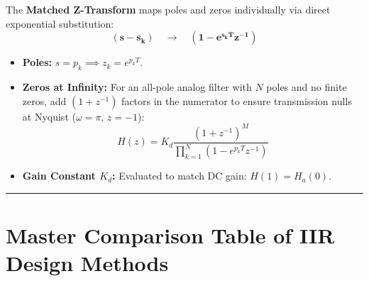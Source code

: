 \documentclass[11pt,a4paper]{article}
\begin{document}
The \textbf{Matched Z-Transform} maps poles and zeros individually via direct exponential substitution:
\begin{equation}
\mathbf{(s - s_k) \quad \longrightarrow \quad (1 - e^{s_k T} z^{-1})}
\end{equation}
\begin{itemize}
    \item \textbf{Poles:} $s = p_k \implies z_k = e^{p_k T}$.
    \item \textbf{Zeros at Infinity:} For an all-pole analog filter with $N$ poles and no finite zeros, add $(1 + z^{-1})$ factors in the numerator to ensure transmission nulls at Nyquist ($\omega = \pi$, $z = -1$):
    \begin{equation}
    H(z) = K_d \frac{(1 + z^{-1})^M}{\prod_{k=1}^N (1 - e^{p_k T} z^{-1})}
    \end{equation}
    \item \textbf{Gain Constant $K_d$:} Evaluated to match DC gain: $H(1) = H_a(0)$.
\end{itemize}

\noindent\rule{\textwidth}{0.5pt}

\section{Master Comparison Table of IIR Design Methods}

\begin{table}[H]
\centering
\caption{Comparison of Impulse Invariance, Bilinear Transformation, and Matched Z-Transform}
\label{tab:comp}
\vspace{2mm}
\end{table}
\end{document}
